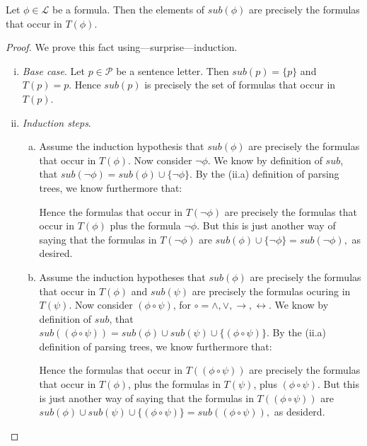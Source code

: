 \begin{enumerate}[\thesection.1]
		\begin{proposition}
		Let $\phi\in\mathcal{L}$ be a formula. Then the elements of $sub(\phi)$ are precisely the formulas that occur in $T(\phi)$.
		\end{proposition}
		\begin{proof}
		We prove this fact using---surprise---induction.
		
		\begin{enumerate}[(i)]
		
			\item \emph{Base case}. Let $p\in\mathcal{P}$ be a sentence letter. Then $sub(p)=\{p\}$ and $T(p)=p$. Hence $sub(p)$ is precisely the set of formulas that occur in $T(p)$.
			
			\item \emph{Induction steps}. 
				\begin{enumerate}[(a)]

					\item Assume the induction hypothesis that $sub(\phi)$ are precisely the formulas that occur in $T(\phi)$. Now consider $\neg \phi$. We know by definition of $sub$, that $sub(\neg\phi)=sub(\phi)\cup\{\neg\phi\}$. By the (ii.a) definition of parsing trees, we know furthermore that:
					\begin{center}
\end{center}
Hence the formulas that occur in $T(\neg\phi)$ are precisely the formulas that occur in $T(\phi)$ plus the formula $\neg\phi$. But this is just another way of saying that the formulas in $T(\neg\phi)$ are  $sub(\phi)\cup\{\neg\phi\}=sub(\neg\phi),$ as desired.

			\item Assume the induction hypotheses that $sub(\phi)$ are precisely the formulas that occur in $T(\phi)$ and $sub(\psi)$ are precisely the formulas ocuring in $T(\psi)$. Now consider $(\phi\circ\psi)$, for $\circ=\land,\lor,\to,\leftrightarrow$. We know by definition of $sub$, that $sub((\phi\circ\psi))=sub(\phi)\cup sub(\psi)\cup\{(\phi\circ\psi)\}$. By the (ii.a) definition of parsing trees, we know furthermore that:
					\begin{center}
\end{center}
Hence the formulas that occur in $T((\phi\circ\psi))$ are precisely the formulas that occur in $T(\phi)$, plus the formulas in $T(\psi)$, plus $(\phi\circ\psi)$. But this is just another way of saying that the formulas in $T((\phi\circ\psi))$ are $sub(\phi)\cup sub(\psi)\cup\{(\phi\circ\psi)\}=sub((\phi\circ\psi)),$ as desiderd.


\end{enumerate}
\end{enumerate}
\end{proof}
\end{enumerate}
